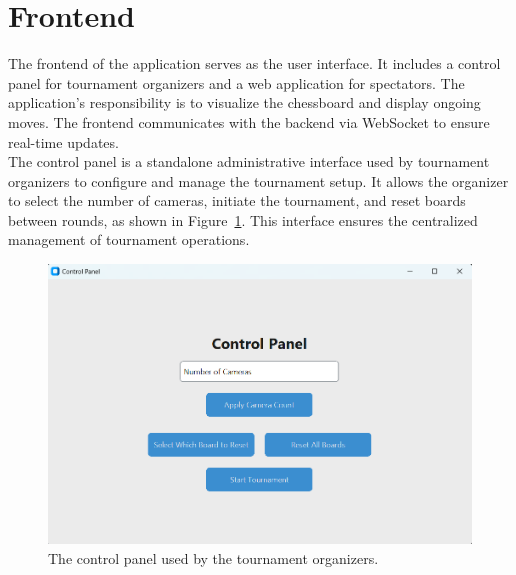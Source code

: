 % 

% 



\section{Frontend}
\label{subsec:results-frontend}
The frontend of the application serves as the user interface. It includes a control panel for tournament organizers and a web application for spectators. The application's responsibility is to visualize the chessboard and display ongoing moves. The frontend communicates with the backend via WebSocket to ensure real-time updates. \\

The control panel is a standalone administrative interface used by tournament organizers to configure and manage the tournament setup. It allows the organizer to select the number of cameras, initiate the tournament, and reset boards between rounds, as shown in Figure~\ref{fig:control-panel}. This interface ensures the centralized management of tournament operations. \\

\begin{figure}[h!] \centering \includegraphics[width=0.75\linewidth]{figures/results/frontend/control-panel/control-panel.png} \caption[Display of control panel]{The control panel used by the tournament organizers.}\label{fig:control-panel} \end{figure}

